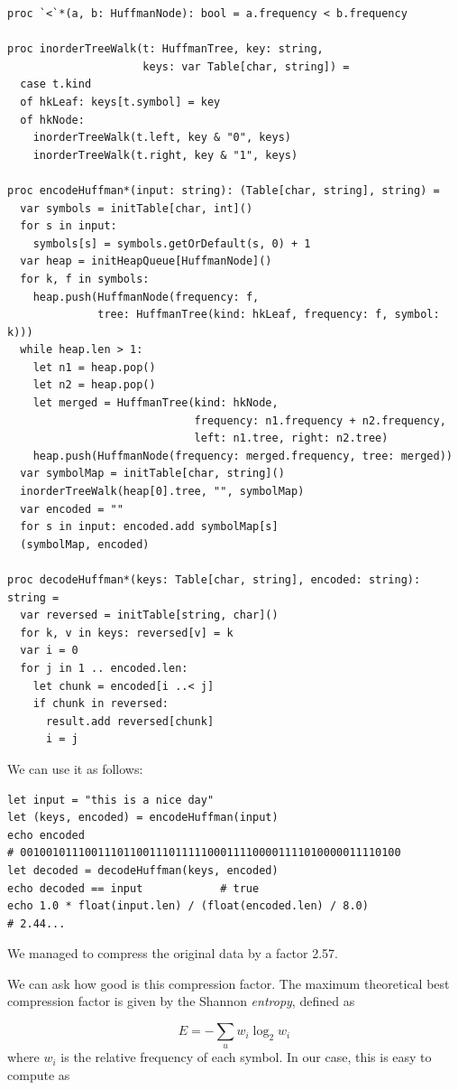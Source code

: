 \documentclass[justified, sixbynine]{tufte-book}
\def\ft{\small\tt}
\theoremstyle{plain}%
\newtheorem * {corollary}{Corollary}
\theoremstyle{definition}
\theoremstyle{remark}
\newtheorem * {remark}{Remark}
\newtheorem * {note}{Note}
\begin{document}
\begin{fullwidth}
\begin{lstlisting}[caption={in file: {\ft nlib/compression.nim}}]
proc `<`*(a, b: HuffmanNode): bool = a.frequency < b.frequency

proc inorderTreeWalk(t: HuffmanTree, key: string,
                     keys: var Table[char, string]) =
  case t.kind
  of hkLeaf: keys[t.symbol] = key
  of hkNode:
    inorderTreeWalk(t.left, key & "0", keys)
    inorderTreeWalk(t.right, key & "1", keys)

proc encodeHuffman*(input: string): (Table[char, string], string) =
  var symbols = initTable[char, int]()
  for s in input:
    symbols[s] = symbols.getOrDefault(s, 0) + 1
  var heap = initHeapQueue[HuffmanNode]()
  for k, f in symbols:
    heap.push(HuffmanNode(frequency: f,
              tree: HuffmanTree(kind: hkLeaf, frequency: f, symbol: k)))
  while heap.len > 1:
    let n1 = heap.pop()
    let n2 = heap.pop()
    let merged = HuffmanTree(kind: hkNode,
                             frequency: n1.frequency + n2.frequency,
                             left: n1.tree, right: n2.tree)
    heap.push(HuffmanNode(frequency: merged.frequency, tree: merged))
  var symbolMap = initTable[char, string]()
  inorderTreeWalk(heap[0].tree, "", symbolMap)
  var encoded = ""
  for s in input: encoded.add symbolMap[s]
  (symbolMap, encoded)

proc decodeHuffman*(keys: Table[char, string], encoded: string): string =
  var reversed = initTable[string, char]()
  for k, v in keys: reversed[v] = k
  var i = 0
  for j in 1 .. encoded.len:
    let chunk = encoded[i ..< j]
    if chunk in reversed:
      result.add reversed[chunk]
      i = j
\end{lstlisting}

We can use it as follows:

\begin{lstlisting}
let input = "this is a nice day"
let (keys, encoded) = encodeHuffman(input)
echo encoded
# 00100101110011101100111011111000111100001111010000011110100
let decoded = decodeHuffman(keys, encoded)
echo decoded == input            # true
echo 1.0 * float(input.len) / (float(encoded.len) / 8.0)
# 2.44...
\end{lstlisting}

We managed to compress the original data by a factor 2.57.


We can ask how good is this compression factor.
The maximum theoretical best compression factor is given by the Shannon {\it entropy}, defined as

\begin{equation}
E = -\sum_u w_i \log_2 w_i
\end{equation}
where $w_i$ is the relative frequency of each symbol.
In our case, this is easy to compute as


\end{fullwidth}
\end{document}
